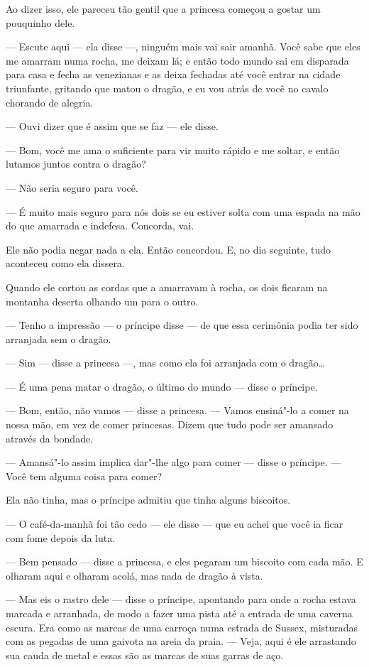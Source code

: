 Ao dizer isso, ele pareceu tão gentil que a princesa começou a gostar
um pouquinho dele.

--- Escute aqui --- ela disse ---, ninguém mais vai sair amanhã. Você sabe
que eles me amarram numa rocha, me deixam lá; e então todo mundo sai
em disparada para casa e fecha as venezianas e as deixa fechadas até
você entrar na cidade triunfante, gritando que matou o dragão, e eu
vou atrás de você no cavalo chorando de alegria.

--- Ouvi dizer que é assim que se faz --- ele disse.

--- Bom, você me ama o suficiente para vir muito rápido e me soltar, e
então lutamos juntos contra o dragão?

--- Não seria seguro para você.

--- É muito mais seguro para nós dois se eu estiver solta com uma espada
na mão do que amarrada e indefesa. Concorda, vai.

Ele não podia negar nada a ela. Então concordou. E, no dia seguinte,
tudo aconteceu como ela dissera. 

Quando ele cortou as cordas que a amarravam à rocha, os dois ficaram
na montanha deserta olhando um para o outro.

--- Tenho a impressão --- o príncipe disse --- de que essa cerimônia podia ter
sido arranjada sem o dragão.

--- Sim --- disse a princesa ---, mas como ela foi arranjada com o dragão\ldots{}

--- É uma pena matar o dragão, o último do mundo --- disse o príncipe.

--- Bom, então, não vamos --- disse a princesa. --- Vamos ensiná"-lo a comer
na nossa mão, em vez de comer princesas. Dizem que tudo pode ser
amansado através da bondade.

--- Amansá"-lo assim implica dar"-lhe algo para comer --- disse o príncipe.
--- Você tem alguma coisa para comer?

Ela não tinha, mas o príncipe admitiu que tinha alguns biscoitos. 

--- O café-da-manhã foi tão cedo --- ele disse --- que eu achei que você ia
ficar com fome depois da luta.

--- Bem pensado --- disse a princesa, e eles pegaram um biscoito com cada
mão. E olharam aqui e olharam acolá, mas nada de dragão à vista.

--- Mas eis o rastro dele --- disse o príncipe, apontando para onde a
rocha estava marcada e arranhada, de modo a fazer uma pista até a
entrada de uma caverna escura. Era como as marcas de uma carroça numa
estrada de Sussex, misturadas com as pegadas de uma gaivota na areia
da praia. --- Veja, aqui é ele arrastando sua cauda de metal e essas
são as marcas de suas garras de aço.

